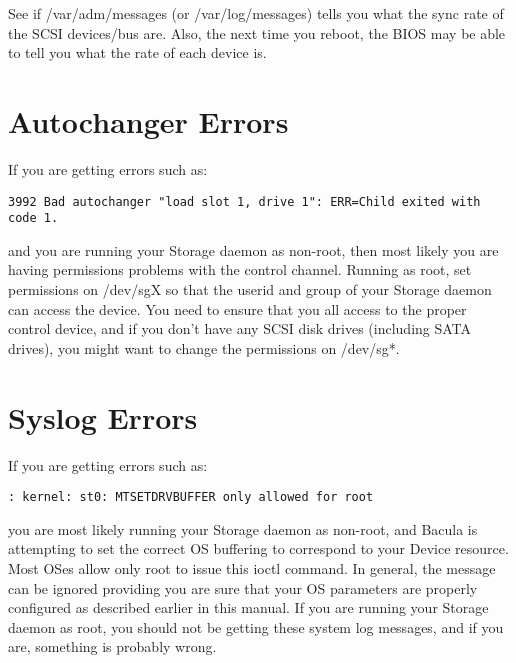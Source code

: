 See if /var/adm/messages (or /var/log/messages) tells you what the sync
rate of the SCSI devices/bus are. Also, the next time you reboot, the
BIOS may be able to tell you what the rate of each device is.


\section{Autochanger Errors}

If you are getting errors such as:

\footnotesize
\begin{verbatim}
3992 Bad autochanger "load slot 1, drive 1": ERR=Child exited with code 1.
\end{verbatim}
\normalsize

and you are running your Storage daemon as non-root, then most likely
you are having permissions problems with the control channel. Running
as root, set permissions on /dev/sgX so that the userid and group of
your Storage daemon can access the device. You need to ensure that you
all access to the proper control device, and if you don't have any
SCSI disk drives (including SATA drives), you might want to change
the permissions on /dev/sg*.

\section{Syslog Errors}

If you are getting errors such as:

\footnotesize
\begin{verbatim}
: kernel: st0: MTSETDRVBUFFER only allowed for root
\end{verbatim}
\normalsize

you are most likely running your Storage daemon as non-root, and
Bacula is attempting to set the correct OS buffering to correspond
to your Device resource. Most OSes allow only root to issue this
ioctl command. In general, the message can be ignored providing
you are sure that your OS parameters are properly configured as
described earlier in this manual.  If you are running your Storage daemon
as root, you should not be getting these system log messages, and if
you are, something is probably wrong.
